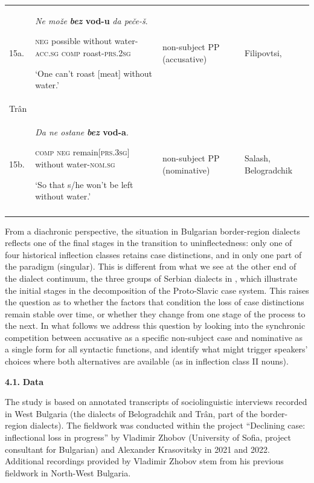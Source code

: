 \documentclass[output=paper]{langscibook}
\begin{document}
\begin{tabularx}{\textwidth}{XXXX}

\lsptoprule
 15a. & \textit{Ne     može} \textbf{\textit{bez}         \textbf{vod-u}               }\textit{da       peče-š}. 

\textsc{neg}   possible  without  water-\textsc{acc.sg}  \textsc{comp}   roast-\textsc{prs.2sg}     

‘One can’t roast [meat] without water.’ & non-subject PP (accusative) & Filipovtsi,                                                                                                              \\
Trân\\
15b. & \textit{Da     ne    ostane} \textbf{\textit{bez}           \textbf{vod-a}}. 

\textsc{comp} \textsc{neg}  remain[\textsc{prs.3sg}]   without   water-\textsc{nom.sg}

‘So that s/he won’t be left without water.’ & non-subject PP (nominative) & Salash,                                               Belogradchik\\
\lspbottomrule
\end{tabularx}
From a diachronic perspective, the situation in Bulgarian border-region dialects reflects one of the final stages in the transition to uninflectedness: only one of four historical inflection classes retains case distinctions, and in only one part of the paradigm (singular). This is different from what we see at the other end of the dialect continuum, the three groups of Serbian dialects in , which illustrate the initial stages in the decomposition of the Proto-Slavic case system. This raises the question as to whether the factors that condition the loss of case distinctions remain stable over time, or whether they change from one stage of the process to the next. In what follows we address this question by looking into the synchronic competition between accusative as a specific non-subject case and nominative as a single form for all syntactic functions, and identify what might trigger speakers’ choices where both alternatives are available (as in inflection class II nouns).

\textbf{4.1.} \textbf{Data} 

The study is based on annotated transcripts of sociolinguistic interviews recorded in West Bulgaria (the dialects of Belogradchik and Trân, part of the border-region dialects). The fieldwork was conducted within the project “Declining case: inflectional loss in progress” by Vladimir Zhobov (University of Sofia, project consultant for Bulgarian) and Alexander Krasovitsky in 2021 and 2022. Additional recordings provided by Vladimir Zhobov stem from his previous fieldwork in North-West Bulgaria. 
\end{document}
